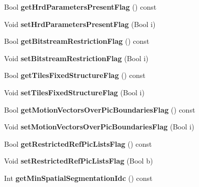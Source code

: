 \begin{DoxyCompactItemize}
Bool {\bfseries get\+Hrd\+Parameters\+Present\+Flag} () const
\item 
\mbox{\label{class_t_com_v_u_i_a4b9938355eb6692f53fba332ce38d846}} 
Void {\bfseries set\+Hrd\+Parameters\+Present\+Flag} (Bool i)
\item 
\mbox{\label{class_t_com_v_u_i_a379ee90168e87e5cad6c7141b9764f4c}} 
Bool {\bfseries get\+Bitstream\+Restriction\+Flag} () const
\item 
\mbox{\label{class_t_com_v_u_i_a2042b2d9e7364c055a3542b6525c421b}} 
Void {\bfseries set\+Bitstream\+Restriction\+Flag} (Bool i)
\item 
\mbox{\label{class_t_com_v_u_i_af0db05ed387f5084d244a962880327f8}} 
Bool {\bfseries get\+Tiles\+Fixed\+Structure\+Flag} () const
\item 
\mbox{\label{class_t_com_v_u_i_ac8edc2e076c1c12418ac966ced716dd2}} 
Void {\bfseries set\+Tiles\+Fixed\+Structure\+Flag} (Bool i)
\item 
\mbox{\label{class_t_com_v_u_i_aa6de31e14bf34199c26c863685d842a5}} 
Bool {\bfseries get\+Motion\+Vectors\+Over\+Pic\+Boundaries\+Flag} () const
\item 
\mbox{\label{class_t_com_v_u_i_a1f8f1ecfa4587cf39ea10438df25876e}} 
Void {\bfseries set\+Motion\+Vectors\+Over\+Pic\+Boundaries\+Flag} (Bool i)
\item 
\mbox{\label{class_t_com_v_u_i_a3336354c13555d064dc654005d7545bd}} 
Bool {\bfseries get\+Restricted\+Ref\+Pic\+Lists\+Flag} () const
\item 
\mbox{\label{class_t_com_v_u_i_afcfadba4359a2b47e559d11cde6a95f7}} 
Void {\bfseries set\+Restricted\+Ref\+Pic\+Lists\+Flag} (Bool b)
\item 
\mbox{\label{class_t_com_v_u_i_a3ad0428c40c4c1d93d5ca262193903a0}} 
Int {\bfseries get\+Min\+Spatial\+Segmentation\+Idc} () const
\item 
\mbox{\label{class_t_com_v_u_i_a857023eaea6d6a3c3abaa375b936adba}} 

\end{DoxyCompactItemize}
